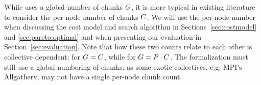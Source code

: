 While \collectiveproblem uses a global number of chunks $G$, it
is more typical in existing literature to consider the per-node number
of chunks $C$. We will use the per-node number when discussing
the cost model and search algorithm in Sections~\ref{sec:costmodel}
and \ref{sec:pareto:optimal} and when presenting our evaluation in
Section~\ref{sec:evaluation}. Note that how these two counts relate to
each other is collective dependent: for \broadcast $G=C$,
while for \allgather $G=P\cdot C$. The formalization
must still use a global numbering of chunks, as some exotic
collectives, e.g. MPI's Allgatherv, may not have a single per-node
chunk count.

